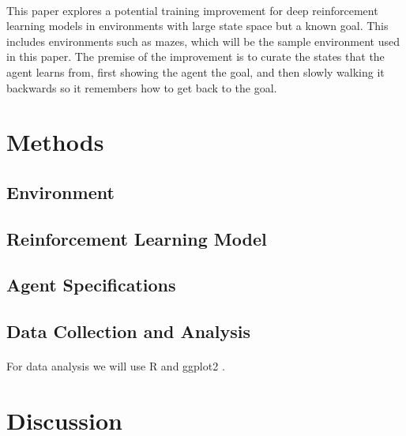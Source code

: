 \documentclass[12pt]{article}
\begin{document}

\paragraph{}
This paper explores a potential training improvement for deep reinforcement learning models in environments with large state space but a known goal.
This includes environments such as mazes, which will be the sample environment used in this paper.
The premise of the improvement is to curate the states that the agent learns from, first showing the agent the goal, and then slowly walking it backwards so it remembers how to get back to the goal.


\section{Methods}

\subsection{Environment}

\subsection{Reinforcement Learning Model}

\subsection{Agent Specifications}

\subsection{Data Collection and Analysis}

\paragraph{}
For data analysis we will use R \cite{lang_r} and ggplot2 \cite{lib_ggplot2}.

\section{Discussion}

\newpage


\end{document}
